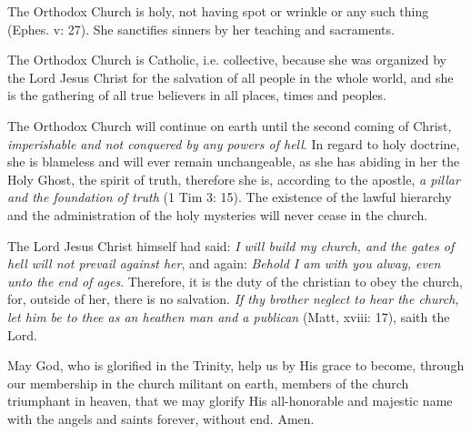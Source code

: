 The Orthodox Church is holy, not having
spot or wrinkle or any such thing (Ephes. v: 
27). She sanctifies sinners by her teaching 
and sacraments. 

The Orthodox Church is Catholic, i.e. collective,
because she was organized by the Lord 
Jesus Christ for the salvation of all people in 
the whole world, and she is the gathering of all 
true believers in all places, times and peoples. 

The Orthodox Church will continue on earth 
until the second coming of Christ, \textit{imperishable 
and not conquered by any powers of hell}. In 
regard to holy doctrine, she is blameless and 
will ever remain unchangeable, as she has 
abiding in her the Holy Ghost, the spirit of truth, 
therefore she is, according to the apostle, \textit{a 
pillar and the foundation of truth} (1 Tim 3: 15). 
The existence of the lawful hierarchy and the 
administration of the holy mysteries will never 
cease in the church. 

The Lord Jesus Christ himself had said: \textit{I 
will build my church, and the gates of hell will 
not prevail against her}, and again: \textit{Behold I 
am with you alway, even unto the end of ages}. 
Therefore, it is the duty of the christian to 
obey the church, for, outside of her, there is no 
salvation. \textit{If thy brother neglect to hear the 
church, let him be to thee as an heathen man
and a publican} (Matt, xviii: 17), saith the 
Lord. 

May God, who is glorified in the Trinity, 
help us by His grace to become, through our 
membership in the church militant on earth, 
members of the church triumphant in heaven, 
that we may glorify His all-honorable and 
majestic name with the angels and saints forever,
without end. Amen.
